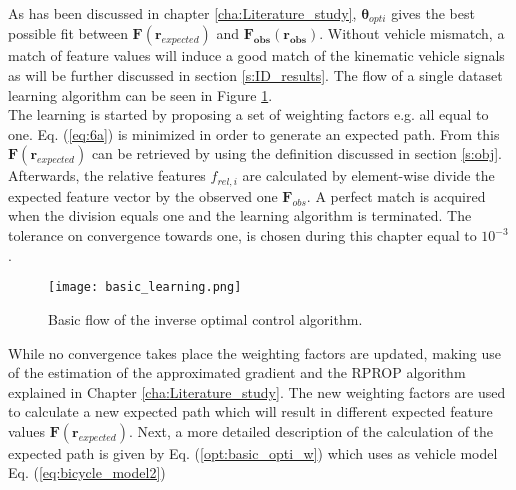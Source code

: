 
As has been discussed in chapter \ref{cha:Literature_study},  $\bm{\theta}_{opti}$ gives the best possible fit between $\bm{F}(\bm{r}_{expected})$ and $\bm{F_{obs}(\bm{r}_{obs})}$.
Without vehicle mismatch, a match of feature values will induce a good match of the kinematic vehicle signals as will be further discussed in section \ref{s:ID_results}.
The flow of a single dataset learning algorithm can be seen in Figure \ref{fig:basic learning}.\\


The learning is started by proposing a set of weighting factors e.g. all equal to one. Eq. (\ref{eq:6a})  is minimized in order to generate an expected path. From this $\bm{F}(\bm{r}_{expected})$ can be retrieved by using the definition discussed in section \ref{s:obj}. Afterwards, the relative features $f_{rel,i}$ are calculated by element-wise  divide  the expected feature vector by the observed one $\bm{F}_{obs}$. A perfect match is acquired when the division equals one and the learning algorithm is terminated. The tolerance on convergence towards one, is chosen during this chapter equal to $10^{-3}$.\\
\vspace{5mm}

\begin{figure}[h!]
	\centering
	\texttt{[image: basic\_learning.png]}
	\caption{Basic flow of the inverse optimal control algorithm.}
	\label{fig:basic learning}
\end{figure}

  
While no convergence takes place the weighting factors are updated, making use of the estimation of the approximated gradient and the RPROP algorithm explained in Chapter \ref{cha:Literature_study}. The new weighting factors are used to calculate a new expected path which will result in different expected feature values $\bm{F}(\bm{r}_{expected})$.  Next, a more detailed description of the calculation of the expected path is given by Eq. (\ref{opt:basic_opti_w}) which uses as vehicle model Eq. (\ref{eq:bicycle_model2}) \\

